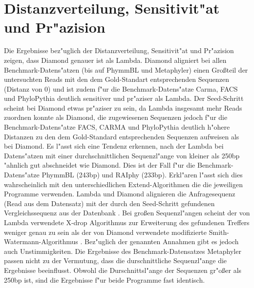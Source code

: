 \documentclass[10pt, a4paper]{report}[08.12.2015]
\begin{document}
    \section{Distanzverteilung, Sensitivit"at und Pr"azision} 
      Die Ergebnisse bez"uglich der Distanzverteilung, Sensitivit"at und 
      Pr"azision zeigen, dass Diamond genauer ist als Lambda. Diamond 				  aligniert
      bei allen Benchmark-Datens"atzen (bis auf PhymmBL und Metaphyler) einen 	  Gro{\ss}teil
      der untersuchten Reads mit den dem Gold-Standart entsprechenden 				  Sequenzen (Distanz von 0) und ist zudem f"ur die Benchmark-Datens"atze Carma, 			  FACS und PhyloPythia deutlich sensitiver und pr"aziser als Lambda.
	  \newline      
      Der 
      Seed-Schritt scheint bei Diamond etwas 
      pr"aziser zu sein, da Lambda insgesamt mehr Reads zuordnen konnte 	  	  als Diamond, die zugewiesenen Sequenzen jedoch f"ur die Benchmark-Datens"atze
      FACS, CARMA und PhyloPythia deutlich h"ohere Distanzen zu den dem 			  Gold-Standard entsprechenden Sequenzen aufweisen als bei Diamond.           
	  \newline      
      Es l"asst 
      sich eine Tendenz erkennen, nach der Lambda bei Datens"atzen mit einer
      durchschnittlichen Sequenzl"ange von kleiner als 250bp "ahnlich gut
      abschneidet wie Diamond. Dies ist der Fall f"ur die Benchmark- Datens"atze PhymmBL
      (243bp) und RAIphy (233bp). Erkl"aren l"asst sich dies wahrscheinlich 
      mit den unterschiedlichen Extend-Algorithmen die die jeweiligen 
      Programme verwenden. Lambda und Diamond alignieren die Anfragesequenz 
      (Read aus dem Datensatz) mit der durch den Seed-Schritt gefundenen 
      Vergleichssequenz aus der Datenbank \cite{buchfink2014, 						  hauswedell2014}. Bei gro{\ss}en Sequenzl"angen scheint der von Lambda
      verwendete X-drop Algorithmus \cite{hauswedell2014} zur Erweiterung
      des gefundenen Treffers weniger genau zu sein als der von Diamond
      verwendete modifizierte Smith-Watermann-Algorithmus 							  \cite{buchfink2014}.\newline
      Bez"uglich der genannten Annahmen gibt es jedoch auch Unstimmigkeiten.
      Die Ergebnisse des Benchmark-Datensatzes Metaphyler passen nicht zu der 
      Vermutung, dass die durschnittliche Sequenzl"ange die Ergebnisse 
      beeinflusst. Obwohl die Durschnittsl"ange der Sequenzen gr"o{\ss}er als
      250bp ist, sind die Ergebnisse f"ur beide Programme fast identisch.
      \newline 
\end{document}
